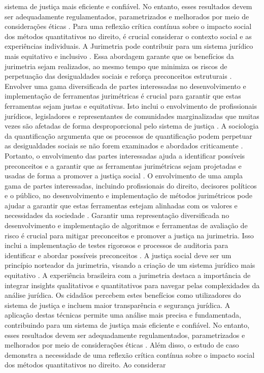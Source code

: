 \begin{agradecimentos}
sistema de justiça mais eficiente e confiável. No entanto, esses resultados devem ser adequadamente regulamentados, parametrizados e melhorados por meio de considerações éticas \cite{101007s1102402209481w}. Para uma reflexão crítica contínua sobre o impacto social dos métodos quantitativos no direito, é crucial considerar o contexto social e as experiências individuais. A Jurimetria pode contribuir para um sistema jurídico mais equitativo e inclusivo \cite{10.1590/dados.2022.65.3.267,10.1057/s41599-020-0396-5}. Essa abordagem garante que os benefícios da jurimetria sejam realizados, ao mesmo tempo que minimiza os riscos de perpetuação das desigualdades sociais e reforça preconceitos estruturais \cite{10.1590/dados.2022.65.3.267,10.1057/s41599-020-0396-5}. Envolver uma gama diversificada de partes interessadas no desenvolvimento e implementação de ferramentas jurimétricas é crucial para garantir que estas ferramentas sejam justas e equitativas. Isto inclui o envolvimento de profissionais jurídicos, legisladores e representantes de comunidades marginalizadas que muitas vezes são afetadas de forma desproporcional pelo sistema de justiça \cite{10.1007/s11186-021-09453-1,1023071190721}. A sociologia da quantificação argumenta que os processos de quantificação podem perpetuar as desigualdades sociais se não forem examinados e abordados criticamente \cite{10.1007/s11186-021-09453-1,1023071190721}. Portanto, o envolvimento das partes interessadas ajuda a identificar possíveis preconceitos e a garantir que as ferramentas jurimétricas sejam projetadas e usadas de forma a promover a justiça social \cite{10.1007/s11186-021-09453-1,1023071190721}. O envolvimento de uma ampla gama de partes interessadas, incluindo profissionais do direito, decisores políticos e o público, no desenvolvimento e implementação de métodos jurimétricos pode ajudar a garantir que estas ferramentas estejam alinhadas com os valores e necessidades da sociedade \cite{unger2021process}. Garantir uma representação diversificada no desenvolvimento e implementação de algoritmos e ferramentas de avaliação de risco é crucial para mitigar preconceitos e promover a justiça na jurimetria. Isso inclui a implementação de testes rigorosos e processos de auditoria para identificar e abordar possíveis preconceitos \cite{10.1590/dados.2022.65.3.267,10.1007/978-3-319-44000-215}. A justiça social deve ser um princípio norteador da jurimetria, visando a criação de um sistema jurídico mais equitativo \cite{10.1590/dados.2022.65.3.267,10.1007/978-3-319-44000-215}. A experiência brasileira com a jurimetria destaca a importância de integrar insights qualitativos e quantitativos para navegar pelas complexidades da análise jurídica. Os cidadãos percebem estes benefícios como utilizadores do sistema de justiça e incluem maior transparência e segurança jurídica. A aplicação destas técnicas permite uma análise mais precisa e fundamentada, contribuindo para um sistema de justiça mais eficiente e confiável. No entanto, esses resultados devem ser adequadamente regulamentados, parametrizados e melhorados por meio de considerações éticas \cite{101007s1102402209481w}. Além disso, o estudo de caso demonstra a necessidade de uma reflexão crítica contínua sobre o impacto social dos métodos quantitativos no direito. Ao considerar 
\end{agradecimentos}
